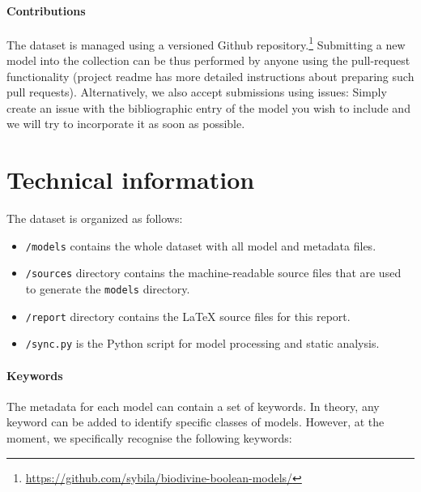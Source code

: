 \documentclass{article}
\begin{document}
\paragraph{Contributions}

The dataset is managed using a versioned Github repository.\footnote{\url{https://github.com/sybila/biodivine-boolean-models/}} Submitting a new model into the collection can be thus performed by anyone using the pull-request functionality (project readme has more detailed instructions about preparing such pull requests). Alternatively, we also accept submissions using issues: Simply create an issue with the bibliographic entry of the model you wish to include and we will try to incorporate it as soon as possible.

\section{Technical information}
\label{section:technical}

The dataset is organized as follows:

\begin{itemize}
	\item \texttt{/models} contains the whole dataset with all model and metadata files.
	\item \texttt{/sources} directory contains the machine-readable source files that are used to generate the \texttt{models} directory.
	\item \texttt{/report} directory contains the LaTeX source files for this report.
	\item \texttt{/sync.py} is the Python script for model processing and static analysis.
\end{itemize}

\paragraph{Keywords} The metadata for each model can contain a set of keywords. In theory, any keyword can be added to identify specific classes of models. However, at the moment, we specifically recognise the following keywords:
\end{document}

